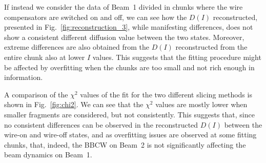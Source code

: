 
If instead we consider the data of Beam~1 divided in chunks where the wire compensators are switched on and off, we can see how the $D(I)$ reconstructed, presented in Fig.~\ref{fig:reconstruction_3}, while manifesting differences, does not show a consistent different diffusion value between the two states. Moreover, extreme differences are also obtained from the $D(I)$ reconstructed from the entire chunk also at lower $I$ values. This suggests that the fitting procedure might be affected by overfitting when the chunks are too small and not rich enough in information.

A comparison of the $\chi^2$ values of the fit for the two different slicing methods is shown in Fig.~\ref{fig:chi2}. We can see that the $\chi^2$ values are mostly lower when smaller fragments are considered, but not consistently. This suggests that, since no consistent differences can be observed in the reconstructed $D(I)$ between the wire-on and wire-off states, and as overfitting issues are observed at some fitting chunks, that, indeed, the BBCW on Beam~2 is not significantly affecting the beam dynamics on Beam~1.

